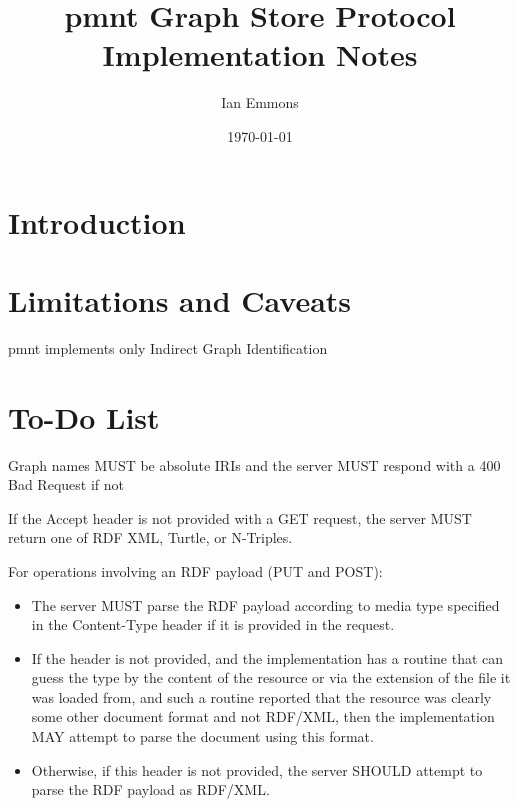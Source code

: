 \documentclass[12pt,letterpaper,draft]{article}
\title{\acl{pmnt} Graph Store Protocol Implementation Notes}
\author{Ian Emmons}
\date{\today}
\begin{document}
\maketitle

\section{Introduction}
\label{sec:intro}

\autocite{SparqlGraphStoreProtocol}



\section{Limitations and Caveats}
\label{sec:limitations}

\ac{pmnt} implements only Indirect Graph Identification



\section{To-Do List}
\label{sec:todo}

Graph names MUST be absolute IRIs and the server MUST respond with a 400 Bad Request if not

If the Accept header is not provided with a GET request, the server MUST return one of RDF XML, Turtle, or N-Triples.

For operations involving an RDF payload (PUT and POST):
\begin{itemize}
	\item The server MUST parse the RDF payload according to media type specified in the Content-Type header if it is provided in the request.

	\item If the header is not provided, and the implementation has a routine that can guess the type by the content of the resource or via the extension of the file it was loaded from, and such a routine reported that the resource was clearly some other document format and not RDF/XML, then the implementation MAY attempt to parse the document using this format.

	\item Otherwise, if this header is not provided, the server SHOULD attempt to parse the RDF payload as RDF/XML.
\end{itemize}
\end{document}
